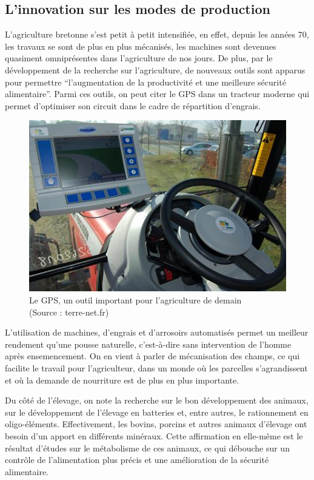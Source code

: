 \documentclass[a4paper,12pt]{report}
\begin{document}
		\subsection{L'innovation sur les modes de production}
			L’agriculture bretonne s’est petit à petit intensifiée, en effet, depuis les années 70, les travaux se sont de plus en plus mécanisés, les machines sont devenues quasiment omniprésentes dans l’agriculture de nos jours. De plus, par le développement de la recherche sur l’agriculture, de nouveaux outils sont apparus pour permettre “l’augmentation de la productivité et une meilleure sécurité alimentaire”\cite{FAOStatisticalYearbook2013}. Parmi ces outils, on peut citer le GPS dans un tracteur moderne\cite{RobotsChamps} qui permet d’optimiser son circuit dans le cadre de répartition d’engrais.
			
			\begin{figure}[!h]
			\centering
			\includegraphics[scale=1]{Illustrations/GPS_Tracteur.jpg}
			\caption{Le GPS, un outil important pour l'agriculture de demain\\(Source : terre-net.fr\cite{GPSEtTracteur})}
			\label{GPSTracteur}
			\end{figure}
			
			L’utilisation de machines, d’engrais et d’arrosoirs automatisés permet un meilleur rendement qu’une pousse naturelle, c’est-à-dire sans intervention de l’homme après ensemencement. On en vient à parler de mécanisation des champs, ce qui facilite le travail pour l’agriculteur, dans un monde où les parcelles s’agrandissent et où la demande de nourriture est de plus en plus importante.
			
			Du côté de l’élevage, on note la recherche sur le bon développement des animaux, sur le développement de l’élevage en batteries et, entre autres, le rationnement en oligo-éléments\cite{OligoElements}. Effectivement, les bovins, porcins et autres animaux d’élevage ont besoin d’un apport en différents minéraux. Cette affirmation en elle-même est le résultat d’études sur le métabolisme de ces animaux, ce qui débouche sur un contrôle de l’alimentation plus précis et une amélioration de la sécurité alimentaire.
			
\end{document}
